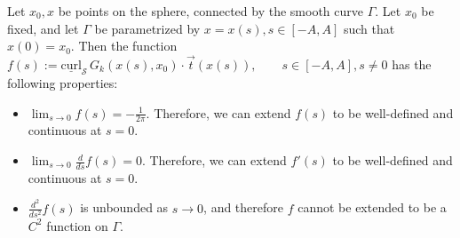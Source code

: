 \documentclass[final]{siamltex}
\renewcommand{\S} {\mathcal{S}}
\begin{document}
\begin{lemma}
Let $x_0,x$ be points on the sphere, connected by the smooth curve $\Gamma$. Let $x_0$ be fixed, and let $\Gamma$ be parametrized by $x=x(s), s\in[-A,A]$ such that $x(0)=x_0$. Then the function 
$f(s):=\underline{\mbox{curl}}_{\S}\,G_k(x(s),x_0)\cdot\vec{t}(x(s)),
\qquad s\in[-A,A], s \neq 0$ has the following properties:
\begin{itemize}
\item $\lim_{s\rightarrow 0} f(s) = -\frac{1}{2\pi}$. Therefore, we can extend $f(s)$ to be well-defined and continuous at $s=0$.
\item $\lim_{s\rightarrow 0} \frac{d}{ds}f(s) =  0$. Therefore, we can extend $f'(s)$ to be well-defined and continuous at $s=0$. 
\item $ \frac{d^2}{ds^2} f(s)$ is unbounded as $s\rightarrow 0$, and therefore $f$ cannot be extended to be a $C^2$ function on $\Gamma$.

\end{itemize}


\end{lemma}
\end{document}
